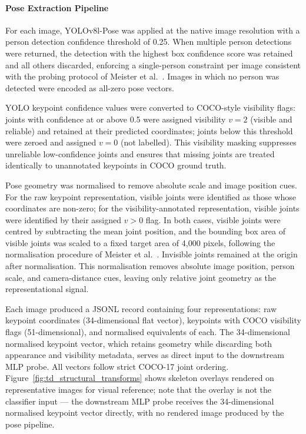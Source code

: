 \paragraph{Pose Extraction Pipeline}
For each image, YOLOv8l-Pose was applied at the native image resolution 
with a person detection confidence threshold of 0.25. When multiple person 
detections were returned, the detection with the highest box confidence 
score was retained and all others discarded, enforcing a single-person 
constraint per image consistent with the probing protocol of Meister et 
al.\ \cite{Meister_2023_GenderArtifactsinVisualDatasets}. Images in which 
no person was detected were encoded as all-zero pose vectors.

YOLO keypoint confidence values were converted to COCO-style visibility 
flags: joints with confidence at or above 0.5 were assigned visibility 
$v = 2$ (visible and reliable) and retained at their predicted coordinates; 
joints below this threshold were zeroed and assigned $v = 0$ (not 
labelled). This visibility masking suppresses unreliable low-confidence 
joints and ensures that missing joints are treated identically to 
unannotated keypoints in COCO ground truth.

Pose geometry was normalised to remove absolute scale and image position 
cues. For the raw keypoint representation, visible joints were identified 
as those whose coordinates are non-zero; for the visibility-annotated 
representation, visible joints were identified by their assigned $v > 0$ 
flag. In both cases, visible joints were centred by subtracting the mean 
joint position, and the bounding box area of visible joints was scaled to a 
fixed target area of 4{,}000 pixels, following the normalisation procedure 
of Meister et al.\ \cite{Meister_2023_GenderArtifactsinVisualDatasets}. 
Invisible joints remained at the origin after normalisation. This 
normalisation removes absolute image position, person scale, and 
camera-distance cues, leaving only relative joint geometry as the 
representational signal.

Each image produced a JSONL record containing four representations: raw 
keypoint coordinates (34-dimensional flat vector), keypoints with COCO 
visibility flags (51-dimensional), and normalised equivalents of each. The 
34-dimensional normalised keypoint vector, which retains geometry while 
discarding both appearance and visibility metadata, serves as direct input 
to the downstream MLP probe. All vectors follow strict COCO-17 joint 
ordering. Figure~\ref{fig:td_structural_transforms} shows skeleton overlays 
rendered on representative images for visual reference; note that 
the overlay is not the classifier input --- the downstream MLP probe 
receives the 34-dimensional normalised keypoint vector directly, with 
no rendered image produced by the pose pipeline.

